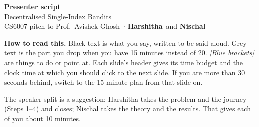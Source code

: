 \documentclass[12pt,a4paper]{article}
\newcommand{\Hs}{\textcolor{harsh}{\textbf{Harshitha}}}
\newcommand{\Ns}{\textcolor{nisch}{\textbf{Nischal}}}
\newcommand{\cut}[1]{\textcolor{cutc}{#1}}
\newcommand{\cue}[1]{{\small\itshape\color{bar}[#1]}}
\begin{document}
\begin{center}
{\LARGE\bfseries Presenter script}\\[0.4em]
{\large Decentralised Single-Index Bandits}\\[0.2em]
{\small CS6007 pitch to Prof.\ Avishek Ghosh \quad·\quad \Hs\ and \Ns}
\end{center}

\vspace{0.4em}
\textbf{How to read this.} Black text is what you say, written to be said aloud.
\cut{Grey text is the part you drop when you have 15 minutes instead of 20.}
\cue{Blue brackets} are things to do or point at. Each slide's header gives its time budget and the clock time
at which you should click to the next slide. If you are more than 30 seconds behind, switch to the 15-minute plan from
that slide on.

The speaker split is a suggestion: Harshitha takes the problem and the journey (Steps 1--4) and closes;
Nischal takes the theory and the results. That gives each of you about 10 minutes.
\end{document}
